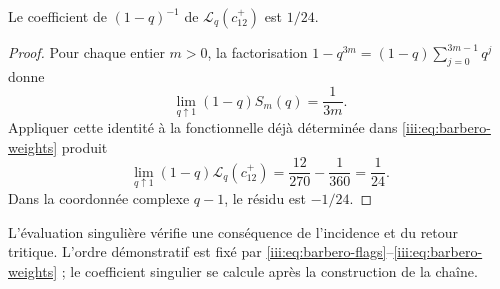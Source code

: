 \begin{proposition}
\label{iii:prop:barbero-pole}
Le coefficient de $(1-q)^{-1}$ de
$\mathscr L_q(c_{12}^{+})$ est $1/24$.
\end{proposition}
\begin{proof}
Pour chaque entier $m>0$, la factorisation
$1-q^{3m}=(1-q)\sum_{j=0}^{3m-1}q^j$ donne
\[
 \lim_{q\uparrow1}(1-q)S_m(q)=\frac1{3m}.
\]
Appliquer cette identité à la fonctionnelle déjà déterminée dans
\eqref{iii:eq:barbero-weights} produit
\begin{equation}
 \lim_{q\uparrow1}(1-q)\mathscr L_q(c_{12}^{+})
 =\frac{12}{270}-\frac1{360}=\frac1{24}.
 \label{iii:eq:barbero-pole}
\end{equation}
Dans la coordonnée complexe $q-1$, le résidu est $-1/24$.
\end{proof}

L’évaluation singulière vérifie une conséquence de l’incidence et du
retour tritique. L’ordre démonstratif est fixé par
\eqref{iii:eq:barbero-flags}--\eqref{iii:eq:barbero-weights} ; le
coefficient singulier se calcule après la construction de la chaîne.

